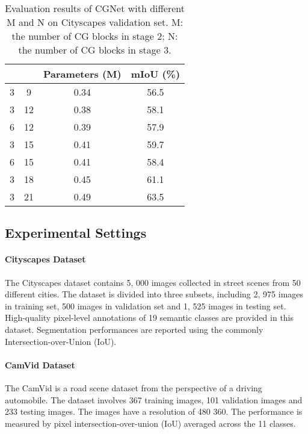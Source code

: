 \documentclass[10pt,twocolumn,letterpaper]{article}
\begin{document}
\begin{table}[t]
\begin{center}
\begin{tabular}{|lccc|}
\hline
  &   & Parameters (M) &{mIoU (\%)}\\
\hline
3 &  9  &  0.34  & 56.5\\
3 &  12  &  0.38  & 58.1\\
6 &  12  &  0.39 & 57.9\\
3 &  15  & 0.41  & 59.7 \\
6 &  15  & 0.41 & 58.4 \\
3 &  18  & 0.45  & 61.1\\
3 &  21  & 0.49 & 63.5\\
\hline
\end{tabular}
\end{center}
\caption{Evaluation results of CGNet with different M and N on Cityscapes validation set. M: the number of CG blocks in stage 2; N: the number of CG blocks in stage 3. }
\label{table:tab6}
\vspace{-5pt}
\end{table}



\subsection{Experimental Settings}


\paragraph{Cityscapes Dataset}
The Cityscapes dataset contains 5, 000 images collected in street scenes from 50 different cities. The dataset is divided into three subsets, including 2, 975 images in training set, 500 images in validation set and 1, 525 images in testing set. High-quality pixel-level annotations of 19 semantic classes are provided in this dataset. Segmentation performances are reported using the commonly Intersection-over-Union (IoU).


\vspace{-10pt}
\paragraph{CamVid Dataset}
The CamVid is a road scene dataset from the perspective of a driving automobile. The dataset involves 367 training images, 101 validation images and 233 testing images. The images have a resolution of 480  360. The performance is measured by pixel intersection-over-union (IoU) averaged across the 11 classes.
\vspace{-10pt}
\end{document}
